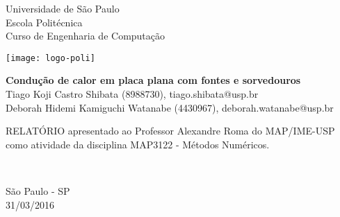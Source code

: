\vspace*{-2cm}
{\bf
\begin{center}
{\large
\hspace*{0cm}Universidade de São Paulo} \\
\hspace*{0cm}Escola Politécnica \\
\hspace*{0cm}Curso de Engenharia de Computação  \\
\end{center}}
\centerline{\texttt{[image: logo-poli]}}
\vspace{.5cm}
\noindent
\begin{center}
{\Large \bf Condução de calor em placa plana com fontes e sorvedouros} \\[2cm]
{\Large Tiago Koji Castro Shibata (8988730), tiago.shibata@usp.br}\\[6mm]
{\Large Deborah Hidemi Kamiguchi Watanabe (4430967), deborah.watanabe@usp.br}\\[6mm]
\vspace{.5cm}
\end{center}

{\raggedleft
\begin{minipage}[t]{8.0cm}
\setlength{\baselineskip}{0.25in}
RELATÓRIO apresentado ao Professor Alexandre Roma do MAP/IME-USP
como atividade da disciplina MAP3122 - Métodos Numéricos.
\end{minipage}\\[2cm]}

\vspace{1cm}
{\center São Paulo - SP \\[3mm]
31/03/2016 \\}

\newpage
